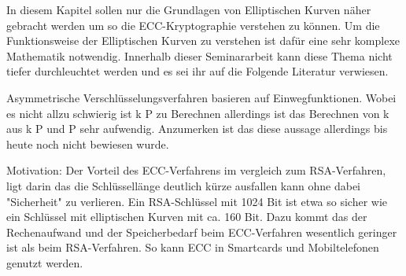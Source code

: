 		
		
		
		In diesem Kapitel sollen nur die Grundlagen von Elliptischen Kurven näher gebracht werden um so die ECC-Kryptographie verstehen zu können. Um die Funktionsweise der Elliptischen Kurven zu verstehen ist dafür eine sehr komplexe Mathematik notwendig. Innerhalb dieser Seminararbeit kann diese Thema nicht tiefer durchleuchtet werden und es sei ihr auf die Folgende Literatur verwiesen. 
		
		
		
		Asymmetrische Verschlüsselungsverfahren basieren auf Einwegfunktionen. Wobei es nicht allzu schwierig ist k \mycdot P zu Berechnen allerdings ist das Berechnen von k aus k \mycdot P und P sehr aufwendig. Anzumerken ist das diese aussage allerdings bis heute noch nicht bewiesen wurde.
		
		
		Motivation: Der Vorteil des ECC-Verfahrens im vergleich zum RSA-Verfahren, ligt darin das die Schlüssellänge deutlich kürze ausfallen kann ohne dabei "Sicherheit" zu verlieren. Ein RSA-Schlüssel mit 1024 Bit ist etwa so sicher wie ein Schlüssel mit elliptischen Kurven mit ca. 160 Bit. Dazu kommt das der Rechenaufwand und der Speicherbedarf beim ECC-Verfahren wesentlich geringer ist als beim RSA-Verfahren. So kann ECC in Smartcards und Mobiltelefonen genutzt werden.\cite{Information:und:Kommunikation}